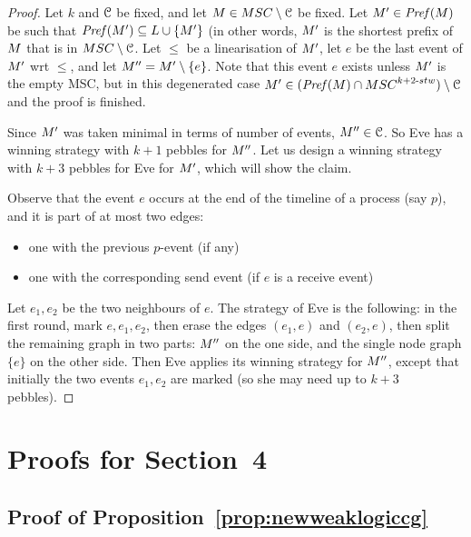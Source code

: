 \documentclass[a4paper,UKenglish,cleveref, autoref, thm-restate]{lipics-v2021}
\begin{document}
\lemcontinuoustwo*

\begin{proof}
	Let $k$ and $\mathcal{C}$ be fixed, and let
	$\msc\in \MSCs\setminus \Class$ be fixed.
	Let $M'\in \mathit{Pref}(M)$ be such that $\mathit{Pref}(M')\subseteq L\cup\{M'\}$
	(in other words, $M'$ is the shortest prefix of $M$ that is in $\MSCs\setminus \Class$.
	Let $\leq$ be a linearisation of $M'$, let $e$ be the last event
	of $M'$ wrt $\leq$, and let $M''=M'\setminus\{e\}$.
	Note that this event
	$e$ exists unless $M'$ is the empty MSC, but in this degenerated case
	$\msc'\in (\Pref{\msc}\cap\stwMSCs{k+2})\setminus \Class$ and the proof
	is finished.

	Since $M'$ was taken minimal in terms of number of events,
	$M''\in \mathcal{C}$.
	So Eve has a winning strategy with $k+1$ pebbles for $M''$.
	Let us design a winning strategy with $k+3$ pebbles for Eve for $M'$, which
	will show the claim.

	Observe that the event $e$ occurs at the end of the timeline of a process (say $p$), and it is part of at most two edges:
	\begin{itemize}
		\item one with the previous $p$-event (if any)
		\item one with the corresponding send event (if $e$ is a receive event)
	\end{itemize}
	Let $e_1,e_2$ be the two neighbours of $e$.
	The strategy of Eve is the following: in the first round, mark $e,e_1,e_2$,
	then erase the edges $(e_1,e)$ and $(e_2,e)$, then split the remaining graph
	in two parts: $M''$ on the one side, and the single node graph $\{e\}$ on
	the other side. Then Eve applies its winning strategy for $M''$, except
	that initially the two events $e_1,e_2$ are marked (so she may need up to $k+3$
	pebbles).
\end{proof}



\section{Proofs for Section~4}

\subsection{Proof of Proposition~\ref{prop:newweaklogiccg}}

\newweaklogiccg*
\end{document}
